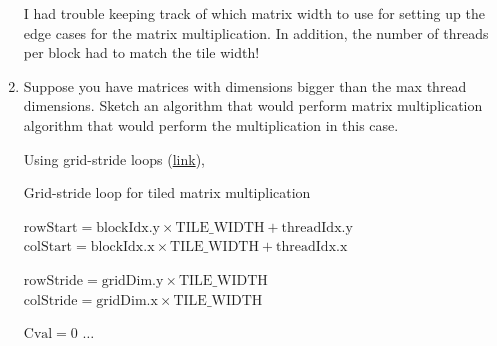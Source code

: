 \documentclass[../main.tex]{subfiles}
\begin{document}
\begin{enumerate}
    I had trouble keeping track of which matrix width to use for setting up the edge cases
    for the matrix multiplication. In addition, the number of threads per block had to match the
    tile width!

    \item Suppose you have matrices with dimensions bigger than the max thread
    dimensions. Sketch an algorithm that would perform matrix multiplication
    algorithm that would perform the multiplication in this case.

    Using grid-stride loops (\href{https://developer.nvidia.com/blog/cuda-pro-tip-write-flexible-kernels-grid-stride-loops/}{link}),

    \begin{algorithm}
        \caption{Grid-stride loop for tiled matrix multiplication}
        \begin{algorithmic}[1]
              
                \State $\text{rowStart} = \text{blockIdx.y} \times \text{TILE\_WIDTH}
                    + \text{threadIdx.y}$  
                \State $\text{colStart} = \text{blockIdx.x} \times \text{TILE\_WIDTH}
                    + \text{threadIdx.x}$ 

                \State
                \State $\text{rowStride} = \text{gridDim.y} \times \text{TILE\_WIDTH}$
                \State $\text{colStride} = \text{gridDim.x} \times \text{TILE\_WIDTH}$
                
                \State
                 
                        \State $\text{Cval} = 0$
                        \State $\dots$ 
                    \EndFor
                \EndFor
            \EndProcedure
        \end{algorithmic}
    \end{algorithm}

\end{enumerate}
\end{document}
